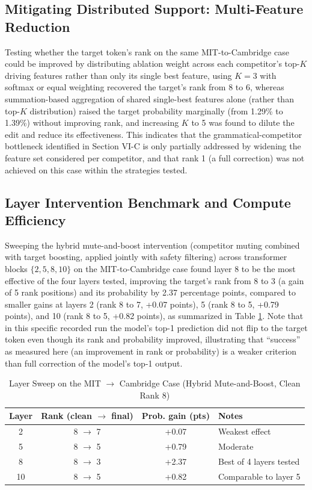 \documentclass[conference]{IEEEtran}
\begin{document}
\subsection{Mitigating Distributed Support: Multi-Feature Reduction}

Testing whether the target token's rank on the same MIT-to-Cambridge case could be improved by distributing ablation weight across each competitor's top-$K$ driving features rather than only its single best feature, using $K=3$ with softmax or equal weighting recovered the target's rank from 8 to 6, whereas summation-based aggregation of shared single-best features alone (rather than top-$K$ distribution) raised the target probability marginally (from 1.29\% to 1.39\%) without improving rank, and increasing $K$ to 5 was found to dilute the edit and reduce its effectiveness. This indicates that the grammatical-competitor bottleneck identified in Section VI-C is only partially addressed by widening the feature set considered per competitor, and that rank 1 (a full correction) was not achieved on this case within the strategies tested.

\subsection{Layer Intervention Benchmark and Compute Efficiency}

Sweeping the hybrid mute-and-boost intervention (competitor muting combined with target boosting, applied jointly with safety filtering) across transformer blocks $\{2, 5, 8, 10\}$ on the MIT-to-Cambridge case found layer 8 to be the most effective of the four layers tested, improving the target's rank from 8 to 3 (a gain of 5 rank positions) and its probability by 2.37 percentage points, compared to smaller gains at layers 2 (rank 8 to 7, +0.07 points), 5 (rank 8 to 5, +0.79 points), and 10 (rank 8 to 5, +0.82 points), as summarized in Table \ref{tab:layer}. Note that in this specific recorded run the model's top-1 prediction did not flip to the target token even though its rank and probability improved, illustrating that ``success'' as measured here (an improvement in rank or probability) is a weaker criterion than full correction of the model's top-1 output.

\begin{table}[htbp]
\caption{Layer Sweep on the MIT $\rightarrow$ Cambridge Case (Hybrid Mute-and-Boost, Clean Rank 8)}
\label{tab:layer}
\centering
\begin{tabular}{@{}cccl@{}}
\toprule
\textbf{Layer} & \textbf{Rank (clean $\to$ final)} & \textbf{Prob. gain (pts)} & \textbf{Notes} \\
\midrule
2  & 8 $\to$ 7 & +0.07 & Weakest effect \\
5  & 8 $\to$ 5 & +0.79 & Moderate \\
8  & 8 $\to$ 3 & +2.37 & Best of 4 layers tested \\
10 & 8 $\to$ 5 & +0.82 & Comparable to layer 5 \\
\bottomrule
\end{tabular}
\end{table}
\end{document}
